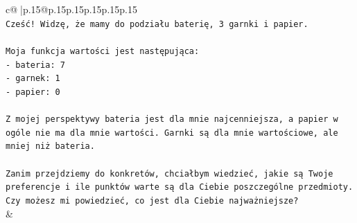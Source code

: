 \documentclass{article}
\begin{document}
{\begin{supertabular}{c@{$\;$}|p{.15\linewidth}@{}p{.15\linewidth}p{.15\linewidth}p{.15\linewidth}p{.15\linewidth}p{.15\linewidth}}
{{{\\ 
\texttt{Cześć! Widzę, że mamy do podziału baterię, 3 garnki i papier.} \\
\\ 
\texttt{Moja funkcja wartości jest następująca:} \\
\texttt{{-} bateria: 7} \\
\texttt{{-} garnek: 1} \\
\texttt{{-} papier: 0} \\
\\ 
\texttt{Z mojej perspektywy bateria jest dla mnie najcenniejsza, a papier w ogóle nie ma dla mnie wartości. Garnki są dla mnie wartościowe, ale mniej niż bateria.} \\
\\ 
\texttt{Zanim przejdziemy do konkretów, chciałbym wiedzieć, jakie są Twoje preferencje i ile punktów warte są dla Ciebie poszczególne przedmioty. Czy możesz mi powiedzieć, co jest dla Ciebie najważniejsze?} \\
            }
        }
    }
    & \\ \\


\end{supertabular}}
\end{document}
